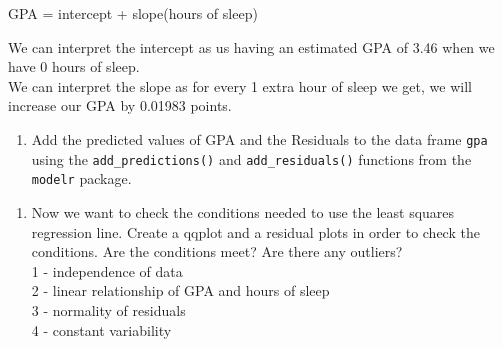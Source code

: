 \documentclass[]{article}
\newenvironment{Shaded}{\begin{snugshade}}{\end{snugshade}}
\newcommand{\KeywordTok}[1]{\textcolor[rgb]{0.13,0.29,0.53}{\textbf{#1}}}
\newcommand{\NormalTok}[1]{#1}
\newcommand{\OperatorTok}[1]{\textcolor[rgb]{0.81,0.36,0.00}{\textbf{#1}}}
\newcommand{\StringTok}[1]{\textcolor[rgb]{0.31,0.60,0.02}{#1}}
\providecommand{\tightlist}{%
  \setlength{\itemsep}{0pt}\setlength{\parskip}{0pt}}
\begin{document}
GPA = intercept + slope(hours of sleep)

We can interpret the intercept as us having an estimated GPA of 3.46
when we have 0 hours of sleep.\\
We can interpret the slope as for every 1 extra hour of sleep we get, we
will increase our GPA by 0.01983 points.

\newpage

\begin{enumerate}
\def\labelenumi{\arabic{enumi}.}
\setcounter{enumi}{5}
\tightlist
\item
  Add the predicted values of GPA and the Residuals to the data frame
  \texttt{gpa} using the \texttt{add\_predictions()} and
  \texttt{add\_residuals()} functions from the \texttt{modelr} package.
\end{enumerate}

\begin{Shaded}
\end{Shaded}

\begin{Shaded}
\end{Shaded}

\begin{enumerate}
\def\labelenumi{\arabic{enumi}.}
\setcounter{enumi}{6}
\tightlist
\item
  Now we want to check the conditions needed to use the least squares
  regression line. Create a qqplot and a residual plots in order to
  check the conditions. Are the conditions meet? Are there any
  outliers?\\
  1 - independence of data\\
  2 - linear relationship of GPA and hours of sleep\\
  3 - normality of residuals\\
  4 - constant variability
\end{enumerate}
\end{document}
